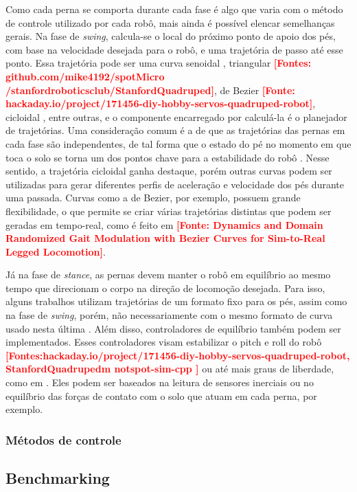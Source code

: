 \documentclass[../main.tex]{subfiles}
\begin{document}
  Como cada perna se comporta durante cada fase é algo que varia com o método de controle utilizado por cada robô, mais ainda é possível elencar semelhanças gerais. Na fase de \textit{swing}, calcula-se o local do próximo ponto de apoio dos pés, com base na velocidade desejada para o robô, e uma trajetória de passo até esse ponto. Essa trajetória pode ser uma curva senoidal \cite{X.118}, triangular \textbf{\textcolor{red}{[Fontes: github.com/mike4192/spotMicro /stanfordroboticsclub/StanfordQuadruped]}}, de Bezier \textbf{\textcolor{red}{[Fonte: hackaday.io/project/171456-diy-hobby-servos-quadruped-robot]}}, cicloidal \cite{Shi2021} \cite{X.58}, entre outras, e o componente encarregado por calculá-la é o planejador de trajetórias. Uma consideração comum é a de que as trajetórias das pernas em cada fase são independentes, de tal forma que o estado do pé no momento em que toca o solo se torna um dos pontos chave para a estabilidade do robô  \cite{X.118}. Nesse sentido, a trajetória cicloidal ganha destaque, porém outras curvas podem ser utilizadas para gerar diferentes perfis de aceleração e velocidade dos pés durante uma passada. Curvas como a de Bezier, por exemplo, possuem grande flexibilidade, o que permite se criar várias trajetórias distintas que podem ser geradas em tempo-real, como é feito em  \textbf{\textcolor{red}{[Fonte: Dynamics and Domain Randomized Gait Modulation with Bezier Curves for Sim-to-Real Legged Locomotion]}}.

  Já na fase de \textit{stance}, as pernas devem manter o robô em equilíbrio ao mesmo tempo que direcionam o corpo na direção de locomoção desejada. Para isso, alguns trabalhos utilizam trajetórias de um formato fixo para os pés, assim como na fase de \textit{swing}, porém, não necessariamente com o mesmo formato de curva usado nesta última \cite{X.118} \cite{X.58}. Além disso, controladores de equilíbrio também podem ser implementados. Esses controladores visam estabilizar o pitch e roll do robô \cite{Shi2021} \textbf{\textcolor{red}{[Fontes:hackaday.io/project/171456-diy-hobby-servos-quadruped-robot, StanfordQuadrupedm notspot-sim-cpp ]}} ou até mais graus de liberdade, como em \cite{Chen2020140736} \cite{X.134} \cite{Zhang2016284}. Eles podem ser baseados na leitura de sensores inerciais ou no equilíbrio das forças de contato com o solo que atuam em cada perna, por exemplo.


  \subsubsection{Métodos de controle}




  \subsection{Benchmarking}

  
\end{document}
